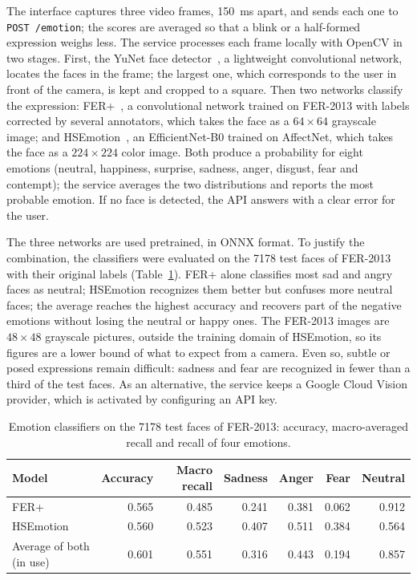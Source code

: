 \documentclass[11pt,letterpaper]{article}
\newcommand{\code}[1]{\texttt{#1}}
\begin{document}
The interface captures three video frames, 150~ms apart, and sends each one to \code{POST /emotion}; the scores are averaged so that a blink or a half-formed expression weighs less. The service processes each frame locally with OpenCV in two stages. First, the YuNet face detector~\cite{wu2023}, a lightweight convolutional network, locates the faces in the frame; the largest one, which corresponds to the user in front of the camera, is kept and cropped to a square. Then two networks classify the expression: FER+~\cite{barsoum2016}, a convolutional network trained on FER-2013 with labels corrected by several annotators, which takes the face as a $64 \times 64$ grayscale image; and HSEmotion~\cite{savchenko2022}, an EfficientNet-B0 trained on AffectNet, which takes the face as a $224 \times 224$ color image. Both produce a probability for eight emotions (neutral, happiness, surprise, sadness, anger, disgust, fear and contempt); the service averages the two distributions and reports the most probable emotion. If no face is detected, the API answers with a clear error for the user.

The three networks are used pretrained, in ONNX format. To justify the combination, the classifiers were evaluated on the 7178 test faces of FER-2013 with their original labels (Table~\ref{tab:emotions}). FER+ alone classifies most sad and angry faces as neutral; HSEmotion recognizes them better but confuses more neutral faces; the average reaches the highest accuracy and recovers part of the negative emotions without losing the neutral or happy ones. The FER-2013 images are $48 \times 48$ grayscale pictures, outside the training domain of HSEmotion, so its figures are a lower bound of what to expect from a camera. Even so, subtle or posed expressions remain difficult: sadness and fear are recognized in fewer than a third of the test faces. As an alternative, the service keeps a Google Cloud Vision provider, which is activated by configuring an API key.

\begin{table}[H]
\centering
\caption{Emotion classifiers on the 7178 test faces of FER-2013: accuracy, macro-averaged recall and recall of four emotions.}
\label{tab:emotions}
\begin{tabular}{lrrrrrr}
\toprule
Model & Accuracy & Macro recall & Sadness & Anger & Fear & Neutral \\
\midrule
FER+ & 0.565 & 0.485 & 0.241 & 0.381 & 0.062 & 0.912 \\
HSEmotion & 0.560 & 0.523 & 0.407 & 0.511 & 0.384 & 0.564 \\
Average of both (in use) & 0.601 & 0.551 & 0.316 & 0.443 & 0.194 & 0.857 \\
\bottomrule
\end{tabular}
\end{table}
\end{document}
